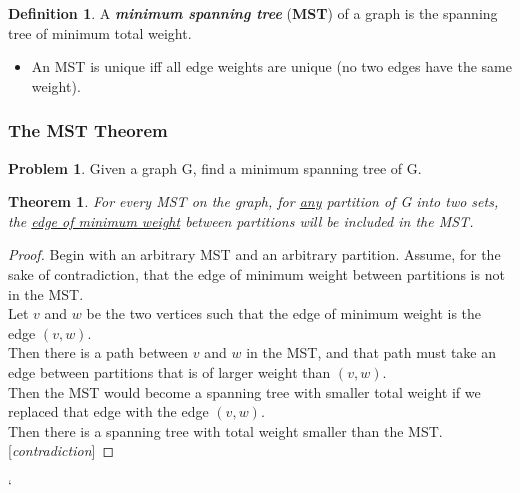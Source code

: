 \documentclass[12pt]{extarticle}
\newtheorem{theorem}{Theorem}[section]
\theoremstyle{definition}
\newtheorem*{definition}{Definition}
\newtheorem*{problem}{Problem}
\theoremstyle{remark}
\begin{document}
\begin{definition}
    A \textbf{\textit{minimum spanning tree}} (\textbf{MST}) of a graph is the spanning tree of minimum total weight. \begin{itemize}
        \item An MST is unique iff all edge weights are unique (no two edges have the same weight).
    \end{itemize}
\end{definition}

\subsubsection*{The MST Theorem}
\begin{problem}
    Given a graph G, find a minimum spanning tree of G.
\end{problem}
\begin{theorem}
    For every MST on the graph, for \ul{any} partition of G into two sets, the \ul{edge of minimum weight} between partitions will be included in the MST.
\end{theorem}

\begin{proof}
Begin with an arbitrary MST and an arbitrary partition. Assume, for the sake of contradiction, that the edge of minimum weight between partitions is not in the MST. \\

Let $v$ and $w$ be the two vertices such that the edge of minimum weight is the edge $(v,w)$. \\

Then there is a path between $v$ and $w$ in the MST, and that path must take an edge between partitions that is of larger weight than $(v,w)$. \\

Then the MST would become a spanning tree with smaller total weight if we replaced that edge with the edge $(v, w)$. \\

Then there is a spanning tree with total weight smaller than the MST. [\textit{contradiction}]
\end{proof}

\pagebreak`
\end{document}
